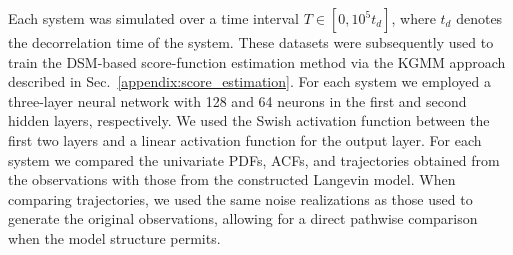 \documentclass[%
  prl,
  reprint,
  amsmath,
  amssymb,
  aps
]{revtex4-2}
\begin{document}
Each system was simulated over a time interval $T \in [0,10^5 t_d]$, where $t_d$ denotes the decorrelation time of the system. These datasets were subsequently used to train the DSM-based score-function estimation method via the KGMM approach described in Sec.~\ref{appendix:score_estimation}. For each system we employed a three-layer neural network with 128 and 64 neurons in the first and second hidden layers, respectively. We used the Swish activation function between the first two layers and a linear activation function for the output layer. For each system we compared the univariate PDFs, ACFs, and trajectories obtained from the observations with those from the constructed Langevin model. When comparing trajectories, we used the same noise realizations as those used to generate the original observations, allowing for a direct pathwise comparison when the model structure permits.
\end{document}

